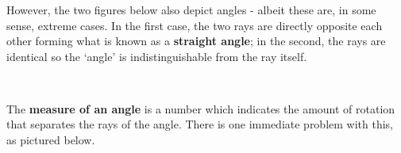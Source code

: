 \documentclass[12pt]{ximera}
\begin{document}
However, the two figures below also depict angles - albeit these are, in some sense, extreme cases.  In the first case, the two rays are directly opposite each other forming what is known as a \textbf{straight angle}; in the second, the rays are identical so the `angle' is indistinguishable from the ray itself.

\[ \begin{array}{cc}

  

&

\hspace{1.75in}

   \\ \end{array} \]

The \textbf{measure of an angle} is a number which indicates the amount of rotation that separates the rays of the angle.  There is one immediate problem with this, as pictured below. 

\[ \begin{array}{cc}

  

& 

\hspace{2in}

 \\ \end{array} \]
\end{document}
